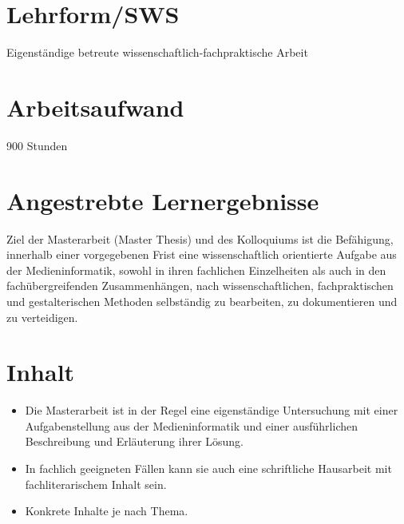 \section*{Lehrform/SWS\label{/mi-2017/modulbeschreibungen-master/MA_All_Modul_Masterarbeit}}\label{lehrformswspathlabelmi-2017modulbeschreibungen-mastermaux5fallux5fmodulux5fmasterarbeit}

Eigenständige betreute wissenschaftlich-fachpraktische Arbeit

\section*{Arbeitsaufwand\label{/mi-2017/modulbeschreibungen-master/MA_All_Modul_Masterarbeit}}\label{arbeitsaufwandpathlabelmi-2017modulbeschreibungen-mastermaux5fallux5fmodulux5fmasterarbeit}

900 Stunden

\section*{Angestrebte
Lernergebnisse\label{/mi-2017/modulbeschreibungen-master/MA_All_Modul_Masterarbeit}}\label{angestrebte-lernergebnissepathlabelmi-2017modulbeschreibungen-mastermaux5fallux5fmodulux5fmasterarbeit}

Ziel der Masterarbeit (Master Thesis) und des Kolloquiums ist die
Befähigung, innerhalb einer vorgegebenen Frist eine wissenschaftlich
orientierte Aufgabe aus der Medieninformatik, sowohl in ihren fachlichen
Einzelheiten als auch in den fachübergreifenden Zusammenhängen, nach
wissenschaftlichen, fachpraktischen und gestalterischen Methoden
selbständig zu bearbeiten, zu dokumentieren und zu verteidigen.

\section*{Inhalt\label{/mi-2017/modulbeschreibungen-master/MA_All_Modul_Masterarbeit}}\label{inhaltpathlabelmi-2017modulbeschreibungen-mastermaux5fallux5fmodulux5fmasterarbeit}

\begin{itemize}
\tightlist
\item
  Die Masterarbeit ist in der Regel eine eigenständige Untersuchung mit
  einer Aufgabenstellung aus der Medieninformatik und einer
  ausführlichen Beschreibung und Erläuterung ihrer Lösung.
\item
  In fachlich geeigneten Fällen kann sie auch eine schriftliche
  Hausarbeit mit fachliterarischem Inhalt sein.
\item
  Konkrete Inhalte je nach Thema.
\end{itemize}

